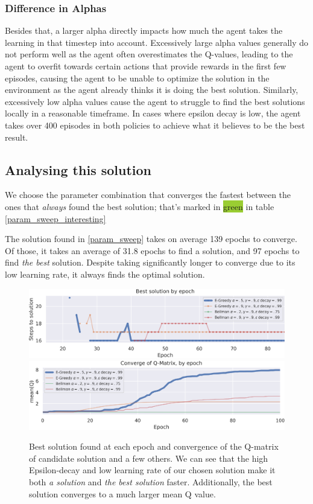 \subsubsection{Difference in Alphas}
Besides that, a larger alpha directly impacts how much the agent takes the learning in that timestep into account. Excessively large alpha values generally do not perform well as the agent often overestimates the Q-values, leading to the agent to overfit towards certain actions that provide rewards in the first few episodes, causing the agent to be unable to optimize the solution in the environment as the agent already thinks it is doing the best solution. Similarly, excessively low alpha values cause the agent to struggle to find the best solutions locally in a reasonable timeframe. In cases where epsilon decay is low, the agent takes over 400 episodes in both policies to achieve what it believes to be the best result.

\subsection{Analysing this solution}
We choose the parameter combination that converges the fastest between the ones that \emph{always} found the best solution; that's marked in \colorbox{YellowGreen}{green} in table \ref{param_sweep_interesting}

The solution found in \cref{param_sweep} takes on average 139 epochs to converge.
Of those, it takes an average of 31.8 epochs to find a solution, and 97 epochs to find \emph{the best} solution.
Despite taking significantly longer to converge due to its low learning rate, it always finds the optimal solution.

\begin{figure}[H]
	\centering
	\includegraphics[width=\textwidth]{task1_best_solution_by_epoch.png} \\[1ex]
	\includegraphics[width=\textwidth]{task1_qmatrix_convergence.png}
	\caption{Best solution found at each epoch and convergence of the Q-matrix of candidate solution and a few others. We can see that the high Epsilon-decay and low learning rate of our chosen solution make it both \emph{a solution} and \emph{the best solution} faster. Additionally, the best solution converges to a much larger mean Q value.}
\end{figure}

